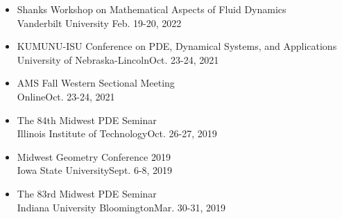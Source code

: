 \documentclass[12pt]{article}
\newenvironment{innerlist}[1][\enskip\textbullet]%
        {\begin{itemize}[#1,leftmargin=*,parsep=0pt,itemsep=0pt,topsep=0pt,partopsep=0pt]}
        {\end{itemize}}
\begin{document}
\begin{innerlist}
\item Shanks Workshop on Mathematical Aspects of Fluid Dynamics\\
Vanderbilt University \hfill Feb. 19-20, 2022



\item KUMUNU-ISU Conference on PDE, Dynamical Systems, and Applications\\ University of Nebraska-Lincoln\hfill Oct. 23-24, 2021

\item AMS Fall Western Sectional Meeting\\ Online\hfill Oct. 23-24, 2021


\item The 84th Midwest PDE Seminar\\ Illinois Institute of Technology\hfill Oct. 26-27, 2019

\item Midwest Geometry Conference 2019\\ Iowa State University\hfill Sept. 6-8, 2019

\item The 83rd Midwest PDE Seminar\\ Indiana University Bloomington\hfill Mar. 30-31, 2019






\end{innerlist}
\end{document}
